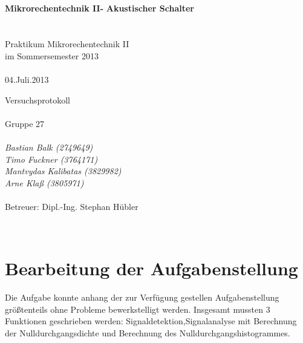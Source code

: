 \documentclass[a4paper,12pt]{article}
\begin{document}
\thispagestyle{empty}

\begin{center}

~\\ \vspace{100pt}

\underline{\hspace{300pt}}\\~\\~\\
{\bf \large Mikrorechentechnik II- } {\large \bf Akustischer Schalter}\\~\\
\underline{\hspace{300pt}}\\

\vspace{50pt}
Praktikum Mikrorechentechnik II\\
im Sommersemester 2013\\~\\
04.Juli.2013
\vspace{200pt}

Versuchsprotokoll\\~\\
Gruppe 27\\~\\
{\it Bastian Balk (2749649)\\ Timo Fuckner (3764171)\\ Mantvydas Kalibatas (3829982)\\ Arne Klaß (3805971)}\\~\\

Betreuer: Dipl.-Ing. Stephan Hübler 

\end{center}

\newpage

\thispagestyle{empty}

~\\ \vspace{40pt}

\tableofcontents
\newpage
\section{Bearbeitung der Aufgabenstellung}
Die Aufgabe konnte anhang der zur Verfügung gestellen Aufgabenstellung größtenteils ohne Probleme bewerkstelligt werden. Insgesamt mussten 3 Funktionen geschrieben werden: Signaldetektion,Signalanalyse 
mit Berechnung der Nulldurchgangsdichte und Berechnung des Nulldurchgangshistogrammes. 
\end{document}
